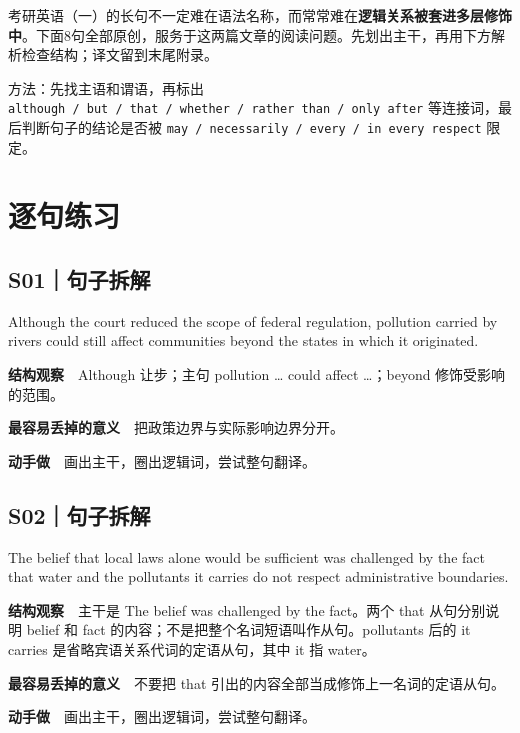 \documentclass[a4paper,11pt,openany]{report}
\renewenvironment{quote}{%
 \par\begin{list}{}{\setlength{\leftmargin}{1.25em}\setlength{\rightmargin}{0em}}\item[]\color{bodygrey}\ignorespaces
}{\end{list}}
\begin{document}
考研英语（一）的长句不一定难在语法名称，而常常难在\textbf{逻辑关系被套进多层修饰中}。下面8句全部原创，服务于这两篇文章的阅读问题。先划出主干，再用下方解析检查结构；译文留到末尾附录。

方法：先找主语和谓语，再标出 \texttt{although\ /\ but\ /\ that\ /\ whether\ /\ rather\ than\ /\ only\ after} 等连接词，最后判断句子的结论是否被 \texttt{may\ /\ necessarily\ /\ every\ /\ in\ every\ respect} 限定。

\section{逐句练习}\label{ux9010ux53e5ux7ec3ux4e60}

\subsection{S01｜句子拆解}\label{s01ux53e5ux5b50ux62c6ux89e3}

\begin{quote}
Although the court reduced the scope of federal regulation, pollution carried by rivers could still affect communities beyond the states in which it originated.
\end{quote}

\textbf{结构观察}　Although 让步；主句 pollution \ldots{} could affect \ldots；beyond 修饰受影响的范围。

\textbf{最容易丢掉的意义}　把政策边界与实际影响边界分开。

\textbf{动手做}　画出主干，圈出逻辑词，尝试整句翻译。

\subsection{S02｜句子拆解}\label{s02ux53e5ux5b50ux62c6ux89e3}

\begin{quote}
The belief that local laws alone would be sufficient was challenged by the fact that water and the pollutants it carries do not respect administrative boundaries.
\end{quote}

\textbf{结构观察}　主干是 The belief was challenged by the fact。两个 that 从句分别说明 belief 和 fact 的内容；不是把整个名词短语叫作从句。pollutants 后的 it carries 是省略宾语关系代词的定语从句，其中 it 指 water。

\textbf{最容易丢掉的意义}　不要把 that 引出的内容全部当成修饰上一名词的定语从句。

\textbf{动手做}　画出主干，圈出逻辑词，尝试整句翻译。
\end{document}
